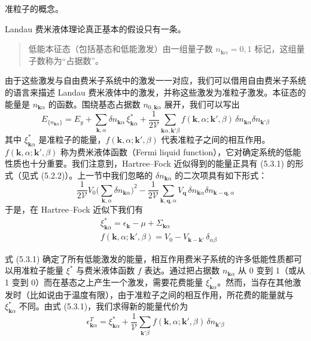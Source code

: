 \begin{keypoints}
\item 准粒子的概念。
\end{keypoints}

Landau 费米液体理论真正基本的假设只有一条。

\begin{quote}
低能本征态（包括基态和低能激发）由一组量子数 $n_{\pmb{k}\alpha}=0,1$ 标记，这组量子数称为“占据数”。
\end{quote}

由于这些激发与自由费米子系统中的激发一一对应，我们可以借用自由费米子系统的语言来描述 Landau 费米液体中的激发，并称这些激发为准粒子激发。本征态的能量是 $n_{\pmb{k}\alpha}$ 的函数。围绕基态占据数 $n_{0,\pmb{k}\alpha}$ 展开，我们可以写出
\begin{equation*}
E_{\{n_{\pmb{k}\alpha}\}} = E_g + \sum_{\pmb{k},\alpha} \delta n_{\pmb{k}\alpha}\, \xi^{*}_{\pmb{k}\alpha} + \frac{1}{2\mathcal{V}} \sum_{\pmb{k}\alpha,\pmb{k}'\beta} f(\pmb{k},\alpha;\pmb{k}',\beta)\, \delta n_{\pmb{k}\alpha} \delta n_{\pmb{k}'\beta} \tag{5.3.1}
\end{equation*}
其中 $\xi^{*}_{\pmb{k}\alpha}$ 是准粒子的能量，$f(\pmb{k},\alpha;\pmb{k}',\beta)$ 代表准粒子之间的相互作用。$f(\pmb{k},\alpha;\pmb{k}',\beta)$ 称为费米液体函数（Fermi liquid function），它对确定系统的低能性质也十分重要。我们注意到，Hartree--Fock 近似得到的能量正具有 (5.3.1) 的形式（见式 (5.2.2)）。上一节中我们忽略的 $\delta n_{\pmb{k}\alpha}$ 的二次项具有如下形式：
\begin{equation*}
\frac{1}{2\mathcal{V}} V_0 \Big( \sum_{\pmb{k},\alpha} \delta n_{\pmb{k}\alpha} \Big)^{2} - \frac{1}{2\mathcal{V}} \sum_{\pmb{k},\pmb{q},\alpha} V_{\pmb{q}}\, \delta n_{\pmb{k}\alpha} \delta n_{\pmb{k}-\pmb{q},\alpha}
\end{equation*}
于是，在 Hartree--Fock 近似下我们有
\begin{align*}
&\xi^{*}_{\pmb{k}\alpha} = \epsilon_{\pmb{k}} - \mu + \Sigma_{\pmb{k}\alpha}\\
&f(\pmb{k},\alpha;\pmb{k}',\beta) = V_0 - V_{\pmb{k}-\pmb{k}'}\, \delta_{\alpha\beta} \tag{5.3.2}
\end{align*}

式 (5.3.1) 确定了所有低能激发的能量，相互作用费米子系统的许多低能性质都可以用准粒子能量 $\xi^{*}$ 与费米液体函数 $f$ 表达。通过把占据数 $n_{\pmb{k}\alpha}$ 从 0 变到 1（或从 1 变到 0）而在基态之上产生一个激发，需要花费能量 $\xi^{*}_{\pmb{k}\alpha}$。然而，当存在其他激发时（比如说由于温度有限），由于准粒子之间的相互作用，所花费的能量就与 $\xi^{*}_{\pmb{k}\alpha}$ 不同。由式 (5.3.1)，我们求得新的能量代价为
\begin{equation*}
\epsilon^{T}_{\pmb{k}\alpha} = \xi^{*}_{\pmb{k}\alpha} + \frac{1}{\mathcal{V}} \sum_{\pmb{k}'\beta} f(\pmb{k},\alpha;\pmb{k}',\beta)\, \delta n_{\pmb{k}'\beta}
\end{equation*}


